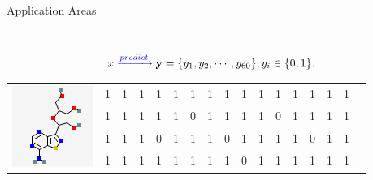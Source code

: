 \documentclass[first=dgreen,second=purple,logo=yellowexc]{aaltoslides}
\newcommand{\blue}{\color{blue}}
\begin{document}
\begin{frame}[allowframebreaks]{Application Areas }
\begin{itemize}
\begin{columns}
\begin{column}{.3\linewidth}
\begin{figure}
        \end{figure} 
        \end{column}
    \end{columns}
            \begin{align*}
            x \xrightarrow{\blue predict} \mathbf{y} = \{y_1,y_2,\cdots,y_{60}\}, y_i \in \{0,1\}.
            \end{align*}
            \begin{center}
            {
            {\begin{table}
            \scriptsize
            \begin{tabular}{p{1cm}p{0.08cm}p{0.08cm}p{0.08cm}p{0.08cm}p{0.08cm}p{0.08cm}p{0.08cm}p{0.08cm}p{0.08cm}p{0.08cm}p{0.08cm}p{0.08cm}p{0.08cm}p{0.08cm}p{0.08cm}p{0.08cm}}
            \multirow{4}{*}{\includegraphics[scale = 0.3]{./plots/mol1.png}} & 
            \cellcolor{purple}1&\cellcolor{purple}1&\cellcolor{purple}1&\cellcolor{purple}1&\cellcolor{purple}1&\cellcolor{purple}1&\cellcolor{purple}1&\cellcolor{purple}1&\cellcolor{purple}1&\cellcolor{purple}1&\cellcolor{purple}1&\cellcolor{purple}1&\cellcolor{purple}1&\cellcolor{purple}1&\cellcolor{purple}1 \\ 
            &\cellcolor{purple}1&\cellcolor{purple}1&\cellcolor{purple}1&\cellcolor{purple}1&\cellcolor{purple}1&\cellcolor{blue}0&\cellcolor{purple}1&\cellcolor{purple}1&\cellcolor{purple}1&\cellcolor{purple}1&\cellcolor{blue}0&\cellcolor{purple}1&\cellcolor{purple}1&\cellcolor{purple}1&\cellcolor{purple}1 \\ 
            &\cellcolor{purple}1&\cellcolor{purple}1&\cellcolor{purple}1&\cellcolor{blue}0&\cellcolor{purple}1&\cellcolor{purple}1&\cellcolor{purple}1&\cellcolor{blue}0&\cellcolor{purple}1&\cellcolor{purple}1&\cellcolor{purple}1&\cellcolor{purple}1&\cellcolor{blue}0&\cellcolor{purple}1&\cellcolor{purple}1 \\ 
            &\cellcolor{purple}1&\cellcolor{purple}1&\cellcolor{purple}1&\cellcolor{purple}1&\cellcolor{purple}1&\cellcolor{purple}1&\cellcolor{purple}1&\cellcolor{purple}1&\cellcolor{blue}0&\cellcolor{purple}1&\cellcolor{purple}1&\cellcolor{purple}1&\cellcolor{purple}1&\cellcolor{purple}1&\cellcolor{purple}1 \\ 

\end{tabular}
\end{table}}}
\end{center}
\end{itemize}
\end{frame}
\end{document}
